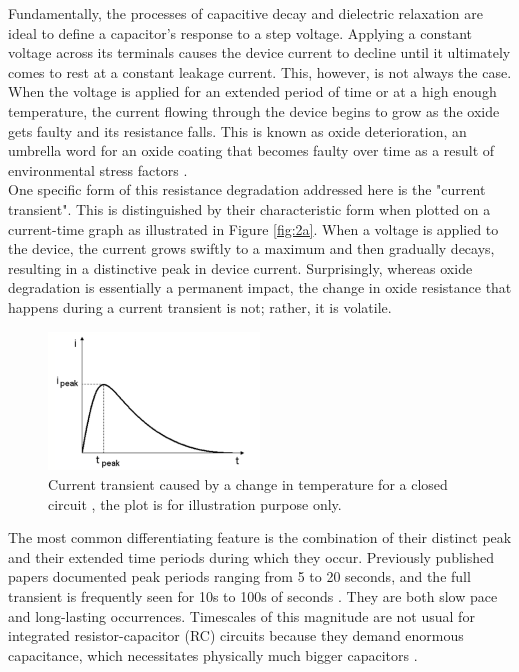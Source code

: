 Fundamentally, the processes of capacitive decay and dielectric relaxation are ideal to define a capacitor's response to a step voltage. Applying a constant voltage across its terminals causes the device current to decline until it ultimately comes to rest at a constant leakage current. This, however, is not always the case. When the voltage is applied for an extended period of time or at a high enough temperature, the current flowing through the device begins to grow as the oxide gets faulty and its resistance falls. This is known as oxide deterioration, an umbrella word for an oxide coating that becomes faulty over time as a result of environmental stress factors \cite{ghibaudo1999emerging}. \\

\noindent One specific form of this resistance degradation addressed here is the "current transient". This is distinguished by their characteristic form when plotted on a current-time graph as illustrated in Figure \ref{fig:2a}. When a voltage is applied to the device, the current grows swiftly to a maximum and then gradually decays, resulting in a distinctive peak in device current. Surprisingly, whereas oxide degradation is essentially a permanent impact, the change in oxide resistance that happens during a current transient is not; rather, it is volatile. \\

\begin{figure}[htbp!] 
\centering    
\includegraphics[width=0.5\textwidth]{Chapter3/Figs/3a.png}
\caption[Current transients illustration]{Current transient caused by a change in temperature for a closed circuit \cite{zafar2011measurement}, the plot is for illustration purpose only.}
\label{fig:3a}
\end{figure}

\noindent The most common differentiating feature is the combination of their distinct peak and their extended time periods during which they occur. Previously published papers documented peak periods ranging from 5 to 20 seconds, and the full transient is frequently seen for 10s to 100s of seconds \cite{saha2001transient}. They are both slow pace and long-lasting occurrences. Timescales of this magnitude are not usual for integrated resistor-capacitor (RC) circuits because they demand enormous capacitance, which necessitates physically much bigger capacitors \cite{el2006space}. \\

